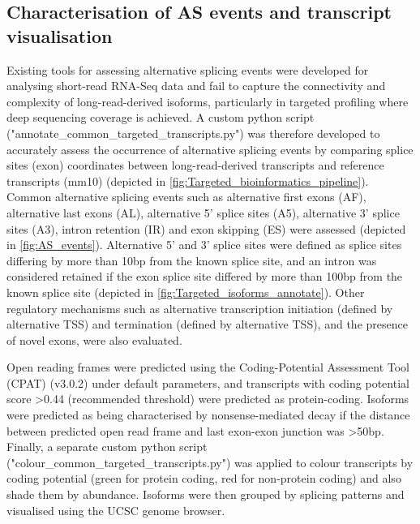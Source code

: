 \newpage
\subsection{Characterisation of AS events and transcript visualisation}
\label{ch6: methods_characterisation}
Existing tools for assessing alternative splicing events were developed for analysing short-read RNA-Seq data and fail to capture the connectivity and complexity of long-read-derived isoforms, particularly in targeted profiling where deep sequencing coverage is achieved. A custom python script ("annotate\_common\_targeted\_transcripts.py") was therefore developed to accurately assess the occurrence of alternative splicing events by comparing splice sites (exon) coordinates between long-read-derived transcripts and reference transcripts (mm10) (depicted in \cref{fig:Targeted_bioinformatics_pipeline}). Common alternative splicing events such as alternative first exons (AF), alternative last exons (AL), alternative 5' splice sites (A5), alternative 3' splice sites (A3), intron retention (IR) and exon skipping (ES) were assessed (depicted in \cref{fig:AS_events}). Alternative 5' and 3' splice sites were defined as splice sites differing by more than 10bp from the known splice site, and an intron was considered retained if the exon splice site differed by more than 100bp from the known splice site (depicted in \cref{fig:Targeted_isoforms_annotate}). Other regulatory mechanisms such as alternative transcription initiation (defined by alternative TSS) and termination (defined by alternative TSS), and the presence of novel exons, were also evaluated. 

Open reading frames were predicted using the Coding-Potential Assessment Tool\cite{Wang2013} (CPAT) (v3.0.2) under default parameters, and transcripts with coding potential score >0.44 (recommended threshold) were predicted as protein-coding. Isoforms were predicted as being characterised by nonsense-mediated decay if the distance between predicted open read frame and last exon-exon junction was >50bp. Finally, a separate custom python script ("colour\_common\_targeted\_transcripts.py") was applied to colour transcripts by coding potential (green for protein coding, red for non-protein coding) and also shade them by abundance. Isoforms were then grouped by splicing patterns and visualised using the UCSC genome browser. 


